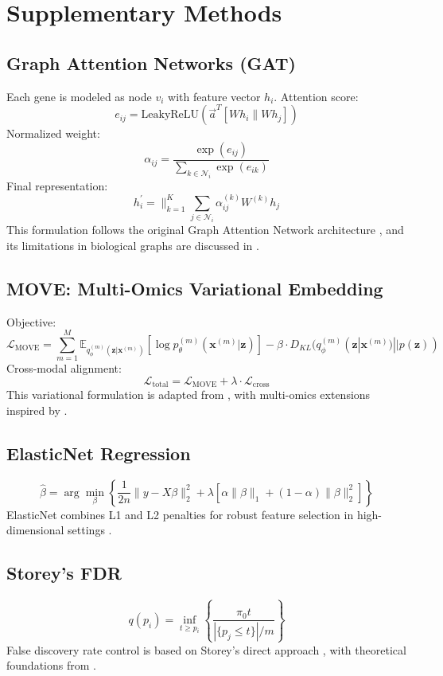 \documentclass[12pt]{article}
\begin{document}
\section*{Supplementary Methods}

\subsection*{Graph Attention Networks (GAT)}
Each gene is modeled as node \( v_i \) with feature vector \( h_i \). Attention score:
\[
e_{ij} = \text{LeakyReLU}\left(\vec{a}^T \left[W h_i \parallel W h_j\right]\right)
\]
Normalized weight:
\[
\alpha_{ij} = \frac{\exp(e_{ij})}{\sum_{k \in \mathcal{N}_i} \exp(e_{ik})}
\]
Final representation:
\[
h_i^{'} = \parallel_{k=1}^K \sum_{j \in \mathcal{N}_i} \alpha_{ij}^{(k)} W^{(k)} h_j
\]
This formulation follows the original Graph Attention Network architecture \citep{velic}, and its limitations in biological graphs are discussed in \citep{xu2020gcn_limitations}.

\subsection*{MOVE: Multi-Omics Variational Embedding}
Objective:
\[
\mathcal{L}_{\text{MOVE}} = \sum_{m=1}^{M} \mathbb{E}_{q_\phi^{(m)}(\mathbf{z}|\mathbf{x}^{(m)})}[\log p_\theta^{(m)}(\mathbf{x}^{(m)}|\mathbf{z})] - \beta \cdot D_{KL}(q_\phi^{(m)}(\mathbf{z}|\mathbf{x}^{(m)}) || p(\mathbf{z}))
\]
Cross-modal alignment:
\[
\mathcal{L}_{\text{total}} = \mathcal{L}_{\text{MOVE}} + \lambda \cdot \mathcal{L}_{\text{cross}}
\]
This variational formulation is adapted from \citep{kingma2014vae}, with multi-omics extensions inspired by \citep{wang2021move, allesoe2023move}.

\subsection*{ElasticNet Regression}
\[
\hat{\beta} = \arg \min_{\beta} \left\{ \frac{1}{2n} \| y - X\beta \|_2^2 + \lambda \left[\alpha \|\beta\|_1 + (1 - \alpha) \|\beta\|_2^2\right] \right\}
\]
ElasticNet combines L1 and L2 penalties for robust feature selection in high-dimensional settings \citep{zou2005regularization}.

\subsection*{Storey's FDR}
\[
q(p_i) = \inf_{t \geq p_i} \left\{ \frac{\pi_0 t}{|\{p_j \leq t\}| / m} \right\}
\]
False discovery rate control is based on Storey's direct approach \citep{storey2002fdr, storey2003statistical}, with theoretical foundations from \citep{benjamini1995controlling, benjamini2001control, dudoit2003multiple}.
\end{document}
